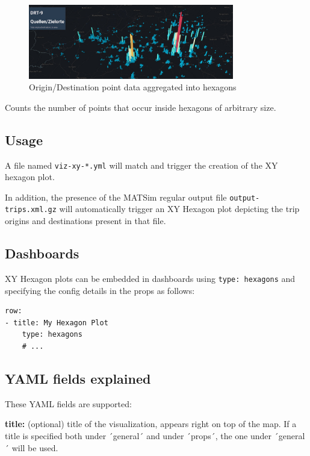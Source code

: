 \begin{figure}[H]
    \centering
    \includegraphics[width=0.8\textwidth]{assets/xy-hexagons.jpg}
    \caption{Origin/Destination point data aggregated into hexagons}
\end{figure}

Counts the number of points that occur inside hexagons of arbitrary size.

\hypertarget{usage}{%
\subsection{Usage}}

A file named \texttt{viz-xy-*.yml} will match and trigger the creation
of the XY hexagon plot.

In addition, the presence of the MATSim regular output file
\texttt{output-trips.xml.gz} will automatically trigger an XY Hexagon
plot depicting the trip origins and destinations present in that file.

\hypertarget{dashboards}{%
\subsection{Dashboards}}

XY Hexagon plots can be embedded in dashboards using
\texttt{type:\ hexagons} and specifying the config details in the props
as follows:

\begin{lstlisting}
row:
- title: My Hexagon Plot
    type: hexagons
    # ...
\end{lstlisting}

\hypertarget{yaml-fields-explained}{%
\subsection{YAML fields explained}}

These YAML fields are supported:

\textbf{title:} (optional) title of the visualization, appears right on
top of the map. If a title is specified both under ´general´ and under
´props´, the one under ´general´ will be used.

